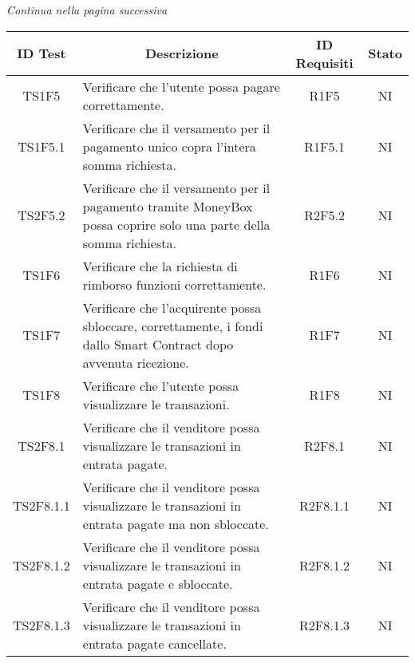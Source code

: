 \begin{center}
  \textit{\small Continua nella pagina successiva}
\end{center}
\begin{table}[H]
  \centering
  \renewcommand{\arraystretch}{1.8}
  \begin{tabular}{c|p{8cm}|c|c}
    \rowcolor[HTML]{125E28}
    \color[HTML]{FFFFFF}\textbf{ID Test}
              & \multicolumn{1}{c}{\color[HTML]{FFFFFF}\textbf{Descrizione}}
              & \color[HTML]{FFFFFF}\textbf{ID Requisiti}
              & \color[HTML]{FFFFFF}\textbf{Stato}                                                                                                 \\
    \hline
    TS1F5     & Verificare che l'utente possa pagare correttamente.                                                                & R1F5     & NI \\
    TS1F5.1   & Verificare che il versamento per il pagamento unico copra l'intera somma richiesta.                                & R1F5.1   & NI \\
    TS2F5.2   & Verificare che il versamento per il pagamento tramite MoneyBox possa coprire solo una parte della somma richiesta. & R2F5.2   & NI \\
    TS1F6     & Verificare che la richiesta di rimborso funzioni correttamente.                                                    & R1F6     & NI \\
    TS1F7     & Verificare che l'acquirente possa sbloccare, correttamente, i fondi dallo Smart Contract dopo avvenuta ricezione.  & R1F7     & NI \\
    TS1F8     & Verificare che l'utente possa visualizzare le transazioni.                                                         & R1F8     & NI \\
    TS2F8.1   & Verificare che il venditore possa visualizzare le transazioni in entrata pagate.                                   & R2F8.1   & NI \\
    TS2F8.1.1 & Verificare che il venditore possa visualizzare le transazioni in entrata pagate ma non sbloccate.                  & R2F8.1.1 & NI \\
    TS2F8.1.2 & Verificare che il venditore possa visualizzare le transazioni in entrata pagate e sbloccate.                       & R2F8.1.2 & NI \\
    TS2F8.1.3 & Verificare che il venditore possa visualizzare le transazioni in entrata pagate cancellate.                        & R2F8.1.3 & NI \\

\end{tabular}
\end{table}
